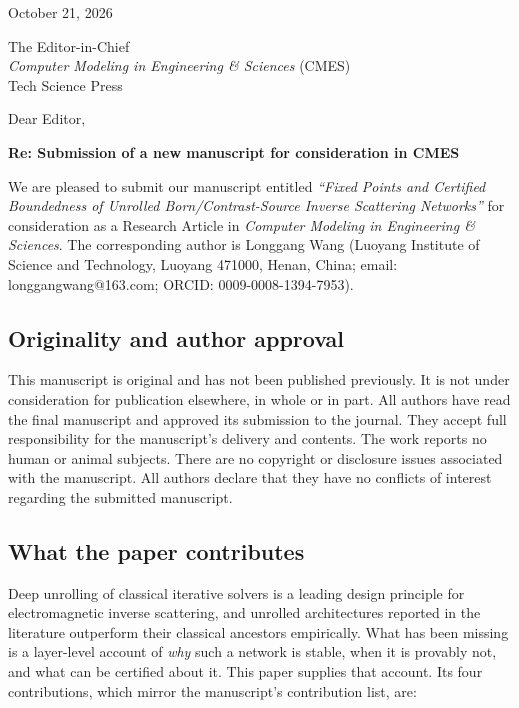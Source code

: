 \documentclass[11pt]{article}
\begin{document}
\begin{flushright}
October 21, 2026
\end{flushright}

\vspace{0.5em}

The Editor-in-Chief \\
\textit{Computer Modeling in Engineering \& Sciences} (CMES) \\
Tech Science Press

\vspace{1em}

Dear Editor,

\vspace{0.5em}

\textbf{Re: Submission of a new manuscript for consideration in CMES}

We are pleased to submit our manuscript entitled \textit{``Fixed Points and Certified
Boundedness of Unrolled Born/Contrast-Source Inverse Scattering Networks''} for
consideration as a Research Article in \textit{Computer Modeling in Engineering \&
Sciences}. The corresponding author is Longgang Wang (Luoyang Institute of Science
and Technology, Luoyang 471000, Henan, China; email: longgangwang@163.com; ORCID:
0009-0008-1394-7953).

\subsection*{Originality and author approval}

This manuscript is original and has not been published previously. It is not under
consideration for publication elsewhere, in whole or in part. All authors have read
the final manuscript and approved its submission to the journal. They accept full
responsibility for the manuscript's delivery and contents. The work reports no human
or animal subjects. There are no copyright or disclosure issues associated with the
manuscript. All authors declare that they have no conflicts of interest regarding
the submitted manuscript.

\subsection*{What the paper contributes}

Deep unrolling of classical iterative solvers is a leading design principle for
electromagnetic inverse scattering, and unrolled architectures reported in the
literature outperform their classical ancestors empirically. What has been missing is a
layer-level account of \emph{why} such a network is stable, when it is provably not,
and what can be certified about it. This paper supplies that account. Its four
contributions, which mirror the manuscript's contribution list, are:
\end{document}
